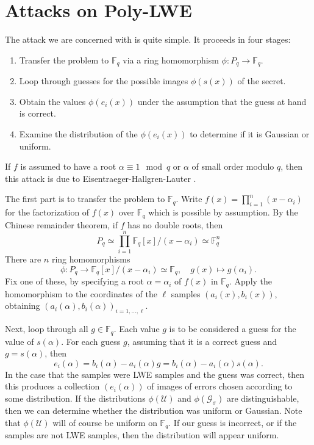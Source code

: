 \documentclass{llncs}
\newcommand{\FF}{\mathbb{F}}
\newcommand{\<}{\langle}
\renewcommand{\>}{\rangle}
\begin{document}
\section{Attacks on Poly-LWE}
\label{sec:attack}

The attack we are concerned with is quite simple.  It proceeds in four stages:
\begin{enumerate}
        \item Transfer the problem to $\FF_q$ via a ring homomorphism $\phi: P_q \rightarrow \FF_q$.
        \item Loop through guesses for the possible images $\phi(s(x))$ of the secret.
        \item Obtain the values $\phi(e_i(x))$ under the assumption that the guess at hand is correct.
        \item Examine the distribution of the $\phi(e_i(x))$ to determine if it is Gaussian or uniform.
\end{enumerate}

If $f$ is assumed to have a root $\alpha \equiv 1 \mod{q}$ or $\alpha$ of small order modulo $q$, then this attack is due to Eisentraeger-Hallgren-Lauter \cite{EHL}.

The first part is to transfer the problem to $\FF_q$.  Write
        $f(x) = \prod_{i=1}^n (x-\alpha_i)$
for the factorization of $f(x)$ over $\FF_q$ which is possible by assumption.  By the Chinese remainder theorem, if $f$ has no double roots, then
\[
        P_q \simeq \prod_{i=1}^n \FF_q[x]/(x-\alpha_i) \simeq \FF_q^n
\]
There are $n$ ring homomorphisms
\[
        \phi: P_q \rightarrow \FF_q[x]/(x-\alpha_i) \simeq \FF_q, \quad g(x) \mapsto g(\alpha_i).
\]
Fix one of these, by specifying a root $\alpha = \alpha_i$ of $f(x)$ in $\FF_q$.  Apply the homomorphism to the coordinates of the $\ell$ samples $(a_i(x), b_i(x))$, obtaining
$(a_i(\alpha), b_i(\alpha))_{i=1,\ldots, \ell}$.

Next,  loop through all $g \in \FF_q$.  Each value $g$ is to be considered a guess for the value of $s(\alpha)$.  For each guess $g$, assuming that it is a correct guess  and $g=s(\alpha)$, then
\[
        e_i(\alpha) = b_i(\alpha) - a_i(\alpha)g = b_i(\alpha) - a_i(\alpha)s(\alpha).
\]
In the case that the samples were LWE samples and the guess was correct, then this produces a collection $(e_i(\alpha))$ of images of errors chosen according to some distribution.
If the distributions $\phi(\mathcal{U})$ and $\phi(\mathcal{G}_{\sigma})$ are distinguishable, then we can determine whether
the distribution was uniform or Gaussian.
Note that $\phi(\mathcal{U})$ will of course be uniform on $\FF_q$.  If our guess is incorrect, or if the samples are not LWE samples, then the distribution will appear uniform.
\end{document}

